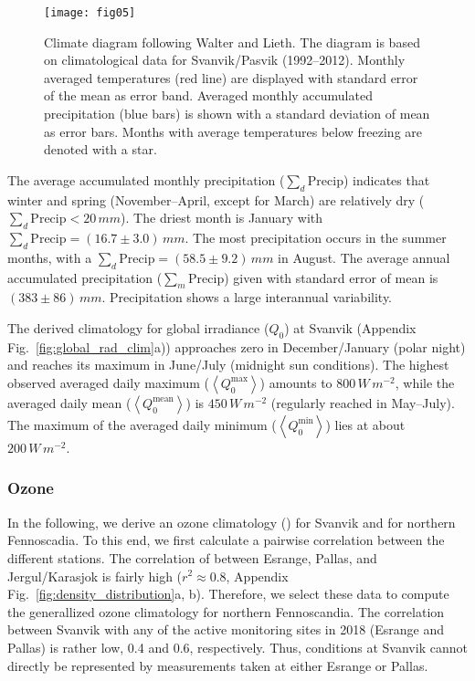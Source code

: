 \documentclass[bg, manuscript]{copernicus}
\begin{document}
\begin{figure}[t]
  \texttt{[image: fig05]}
  \caption{Climate diagram following Walter and Lieth. The diagram is based on climatological data for Svanvik/Pasvik (1992--2012). Monthly averaged temperatures (red line) are displayed with standard error of the mean as error band. Averaged monthly accumulated precipitation (blue bars) is shown with a standard deviation of mean as error bars. Months with average temperatures below freezing are denoted with a star.}
  \label{fig:climatediagram}
\end{figure}

The average accumulated monthly precipitation ($\sum_d\mathrm{Precip}$) indicates that winter and spring (November--April, except for March) are relatively dry ($\sum_d\mathrm{Precip} < 20\,\unit{mm}$). The driest month is January with $\sum_d\mathrm{Precip} = (16.7\pm 3.0)\,\unit{mm}$. The most precipitation occurs in the summer months, with a $\sum_d\mathrm{Precip} = (58.5\pm 9.2)\,\unit{mm}$ in August. The average annual accumulated precipitation ($\sum_m\mathrm{Precip}$) given with standard error of mean is $(383\pm 86)\,\unit{mm}$. Precipitation shows a large interannual variability.

The derived climatology for global irradiance ($Q_0$) at Svanvik (Appendix Fig.~\ref{fig:global_rad_clim}a)) approaches zero in December/January (polar night) and reaches its maximum in June/July (midnight sun conditions). The highest observed averaged daily maximum ($\left<Q_0^\mathrm{max}\right>$) amounts to $800\,\unit{W\,m^{-2}}$, while the averaged daily mean ($\left<Q_0^\mathrm{mean}\right>$) is $450\,\unit{W\,m^{-2}}$ (regularly reached in May--July). The maximum of the averaged daily minimum ($\left<Q_0^\mathrm{min}\right>$) lies at about $200\,\unit{W\,m^{-2}}$.


\subsubsection{Ozone}
\label{subsubsec:clim_ozone}
In the following, we derive an ozone climatology (\chem{\left<[O_3]\right>}) for Svanvik and for northern Fennoscadia. To this end, we first calculate a pairwise correlation between the different stations. The correlation of \chem{[O_3]} between Esrange, Pallas, and Jergul/Karasjok is fairly high ($r^2\approx 0.8$, Appendix Fig.~\ref{fig:density_distribution}a, b). Therefore, we select these data to compute the generallized ozone climatology for northern Fennoscandia. The correlation between Svanvik with any of the active monitoring sites in 2018 (Esrange and Pallas) is rather low, 0.4 and 0.6, respectively. Thus, conditions at Svanvik cannot directly be represented by measurements taken at either Esrange or Pallas.
\end{document}
